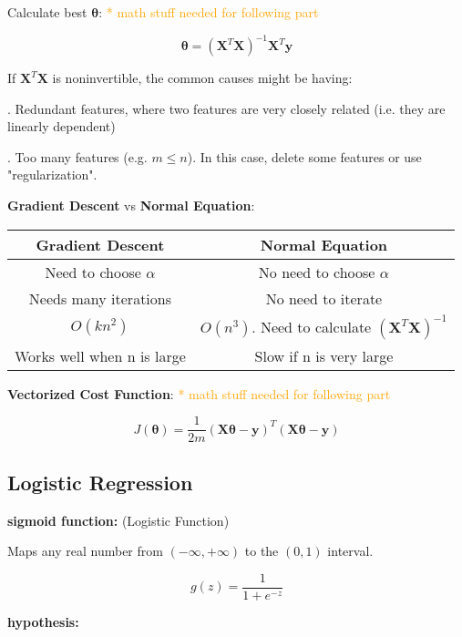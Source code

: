\documentclass{article}
\begin{document}
\noindent Calculate best \(\boldsymbol{\theta}\): \textcolor{orange}{ * math stuff needed for following part}

\[
\boldsymbol{\theta} = (\textbf{X}^T\textbf{X})^{-1}\textbf{X}^T\textbf{y}
\]

\noindent If \(\textbf{X}^T\textbf{X}\) is noninvertible, the common causes might be having:

. Redundant features, where two features are very closely related (i.e. they are linearly dependent)

. Too many features (e.g. \(m \leq n\)). In this case, delete some features or use "regularization".

\bigskip

\noindent \textbf{Gradient Descent} vs \textbf{Normal Equation}:

\begin{center}
\begin{tabular}{ | c | c | } 
\hline
\textbf{Gradient Descent} & \textbf{Normal Equation} \\ 
\hline
Need to choose \(\alpha\) & No need to choose \(\alpha\) \\ 
\hline
Needs many iterations & No need to iterate \\ 
\hline
\(O(kn^2)\) & \(O(n^3)\). Need to calculate \((\textbf{X}^T\textbf{X})^{-1}\) \\ 
\hline
Works well when n is large & Slow if n is very large \\ 
\hline
\end{tabular}
\end{center}

\bigskip

\noindent \textbf{Vectorized Cost Function}: \textcolor{orange}{ * math stuff needed for following part}

\[J(\boldsymbol{\theta}) = \frac{1}{2m} (\textbf{X}\boldsymbol{\theta} - \textbf{y})^T(\textbf{X}\boldsymbol{\theta} - \textbf{y})\]

\subsection{Logistic Regression}

\noindent \textbf{sigmoid function:} (Logistic Function)

\noindent Maps any real number from \((-\infty, +\infty)\) to the \((0, 1)\) interval.

\[g(z) = \frac{1}{1 + e^{-z}}\]

\noindent \textbf{hypothesis:}
\end{document}

